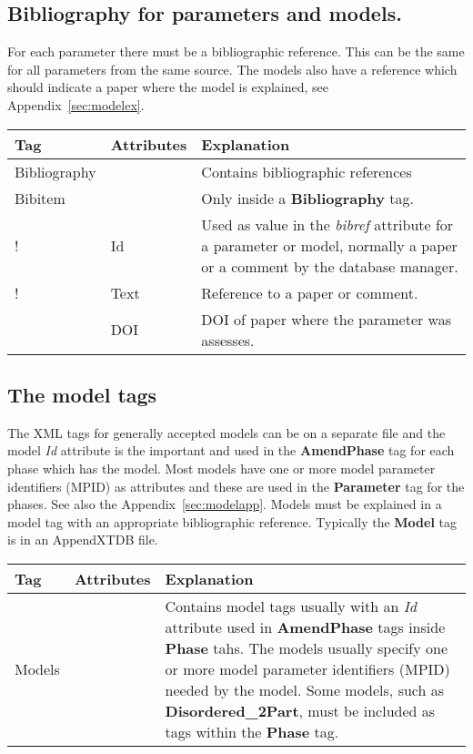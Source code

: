 \documentclass{article}
\begin{document}
\subsection{Bibliography for parameters and models.}\label{sec:biblio}

For each parameter there must be a bibliographic reference.  This can
be the same for all parameters from the same source.  The models also
have a reference which should indicate a paper where the model is
explained, see Appendix~\ref{sec:modelex}.

\bigskip
\begin{tabular}{|p{} p{} p{}|}\hline
  Tag & Attributes &  Explanation\\\hline

  Bibliography & & Contains bibliographic references\\\hline

  Bibitem & & Only inside a {\bf Bibliography} tag.\\
!      & Id &   Used as value in the {\em bibref} attribute for a parameter
            or model, normally a paper or a comment by the database manager.\\
!      & Text & Reference to a paper or comment.\\
       & DOI & DOI of paper where the parameter was assesses.\\\hline
\end{tabular}

\subsection{The model tags}\label{sec:models}

The XML tags for generally accepted models can be on a separate file
and the model {\em Id} attribute is the important and used in the {\bf
  AmendPhase} tag for each phase which has the model.  Most models
have one or more model parameter identifiers (MPID) as attributes and
these are used in the {\bf Parameter} tag for the phases.  See also
the Appendix~\ref{sec:modelapp}.  Models must be explained in a model
tag with an appropriate bibliographic reference.  Typically the {\bf
  Model} tag is in an AppendXTDB file.

\bigskip
\begin{tabular}{|p{} p{} p{}|}\hline
  Tag & Attributes & Explanation\\\hline

  Models & & Contains model tags usually with an {\em Id} attribute
  used in {\bf AmendPhase} tags inside {\bf Phase} tahs.  The models
  usually specify one or more model parameter identifiers (MPID)
  needed by the model.  Some models, such as {\bf Disordered\_2Part},
  must be included as tags within the {\bf Phase} tag.\\\hline
\end{tabular}
\end{document}
